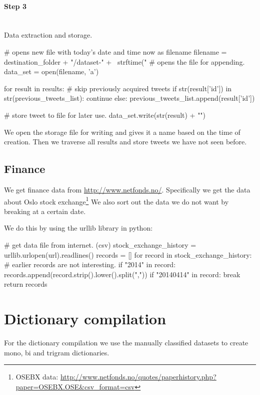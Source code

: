 \paragraph{Step 3}
\hspace{0pt}\\
Data extraction and storage.
\begin{python}
# opens new file with today's date and time now as filename
filename = destination_folder + "/dataset-" + \
    strftime("%
# opens the file for appending.
data_set = open(filename, 'a')

for result in results:
    # skip previously acquired tweets
    if str(result['id']) in str(previous_tweets_list):
        continue
    else:
        previous_tweets_list.append(result['id'])
    
    # store tweet to file for later use.
    data_set.write(str(result) + "\n")
\end{python}

We open the storage file for writing and gives it a name based on the time of
creation. Then we traverse all results and store tweets we have not seen
before. 

\subsection{Finance}
We get finance data from \url{http://www.netfonds.no/}. Specifically we get the
data about Oslo stock exchange\footnote{OSEBX data:
\url{http://www.netfonds.no/quotes/paperhistory.php?paper=OSEBX.OSE&csv_format=csv}}
We also sort out the data we do not want by breaking at a certain date. 

We do this by using the urllib library in python: 
\begin{python}
# get data file from internet. (csv)
stock_exchange_history = urllib.urlopen(url).readlines()
records = []
for record in stock_exchange_history:
    # earlier records are not interesting.
    if "2014" in record:
        records.append(record.strip().lower().split(","))
    if "20140414" in record:
        break
return records
\end{python}
%

\section{Dictionary compilation}\label{code:dictionary_compilation}
For the dictionary compilation we use the manually classified datasets to
create mono, bi and trigram dictionaries. 

